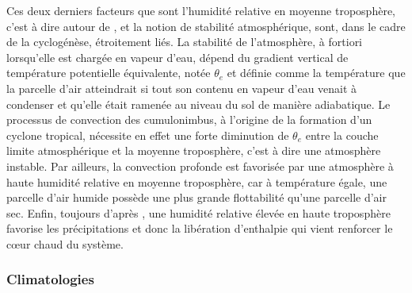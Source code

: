 \documentclass[../main.tex]{subfiles}
\begin{document}
Ces deux derniers facteurs que sont l'humidité relative en moyenne troposphère, c'est à dire autour de , et la notion de stabilité atmosphérique, sont,
dans le cadre de la cyclogénèse, étroitement liés. La stabilité de l'atmosphère, à fortiori lorsqu'elle est chargée en vapeur d'eau, dépend du gradient vertical
de température potentielle équivalente, notée $\theta_e$ et définie comme la température que la parcelle d'air atteindrait si tout son contenu en vapeur d'eau
venait à condenser et qu'elle était ramenée au niveau du sol de manière adiabatique. Le processus de convection des cumulonimbus, à l'origine de la formation
d'un cyclone tropical, nécessite en effet une forte diminution de $\theta_e$ entre la couche limite atmosphérique et la moyenne troposphère, c'est à dire une
atmosphère instable. Par ailleurs, la convection profonde est favorisée par une atmosphère à haute humidité relative en moyenne troposphère, car à température
égale, une parcelle d'air humide possède une plus grande flottabilité qu'une parcelle d'air sec. Enfin, toujours d'après \cite{gray_tropical_1975}, une humidité
relative élevée en haute troposphère favorise les précipitations et donc la libération d'enthalpie qui vient renforcer le cœur chaud du système.

\subsubsection{Climatologies}
\end{document}
